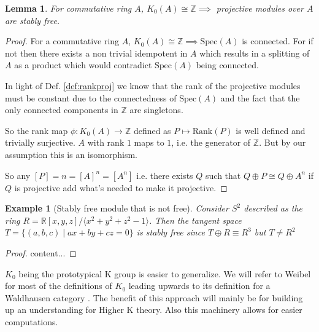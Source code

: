 \documentclass[12pt]{article}
\numberwithin{equation}{section}
\newcommand{\Z}{\mathbb{Z}}
\newcounter{dummy} \numberwithin{dummy}{section}
\newtheorem{lemma}[dummy]{Lemma}
\newtheorem{example}[dummy]{Example}
\begin{document}
	\begin{lemma} For commutative ring $A$, 
		$K_0(A) \cong \Z \implies $ projective modules over $A$ are stably free.
	\end{lemma}
	\begin{proof}
		For a commutative ring $A$, $K_0(A) \cong \Z \implies \mathrm{Spec}(A)$ is connected. For if not then there exists a non trivial idempotent in $A$ which results in a splitting of $A$ as a product which would contradict $\mathrm{Spec}(A)$ being connected.
		
		In light of Def. \ref{def:rankproj} we know that the rank of the projective modules must be constant due to the connectedness of $\mathrm{Spec}(A)$ and the fact that the only connected components in $\Z $ are singletons. 
		
		So the rank map $\phi:K_0(A) \to \Z $ defined as $P \mapsto \mathrm{Rank}(P)$ is well defined and trivially surjective. $A$ with rank $1$ maps to $1$, i.e. the generator of $\Z$. But by our assumption this is an isomorphism.				
		
		So any $[P]=n=[A]^n=[A^n]$ i.e. there exists $Q$ such that $Q\oplus P \cong Q \oplus A^n$ if $Q$ is projective add what's needed to make it projective.
	\end{proof}
	
	\begin{example}[Stably free module that is not free]
		Consider $S^2$ described as the ring $R=\mathbb{R}[x,y,z]/\langle x^2+y^2+z^2-1 \rangle $. Then the tangent space $T=\{ (a,b,c) \mid ax+by+cz=0  \}$ is stably free since $T \oplus R \equiv R^3 $ but $T \neq R^2$
	\end{example}
	\begin{proof}
		content...
	\end{proof}
	$K_0$ being the prototypical K group is easier to generalize. We will refer to Weibel for most of the definitions of $K_0$ leading upwards to its definition for a Waldhausen category \cite{weibel2013k}. The benefit of this approach will mainly be for building up an understanding for Higher K theory. Also this machinery allows for easier computations.
	
\end{document}
